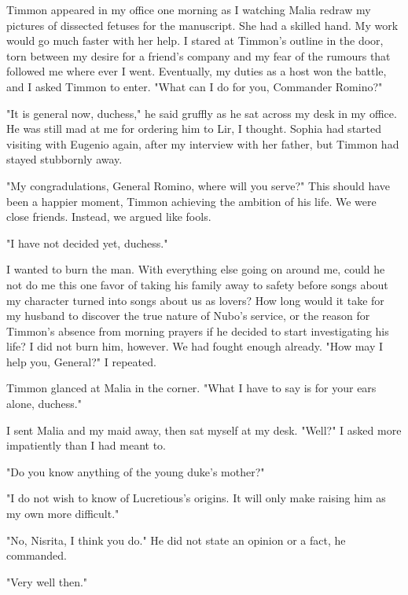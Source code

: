 \documentclass{article}
\begin{document}
Timmon appeared in my office one morning as I watching Malia redraw my pictures of dissected fetuses for the manuscript. She had a skilled hand. My work would go much faster with her help. I stared at Timmon's outline in the door, torn between my desire for a friend's company and my fear of the rumours that followed me where ever I went. Eventually, my duties as a host won the battle, and I asked Timmon to enter. "What can I do for you, Commander Romino?"

"It is general now, duchess," he said gruffly as he sat across my desk in my office. He was still mad at me for ordering him to Lir, I thought. Sophia had started visiting with Eugenio again, after my interview with her father, but Timmon had stayed stubbornly away. 

"My congradulations, General Romino, where will you serve?" This should have been a happier moment, Timmon achieving the ambition of his life. We were close friends. Instead, we argued like fools. 

"I have not decided yet, duchess."

I wanted to burn the man. With everything else going on around me, could he not do me this one favor of taking his family away to safety before songs about my character turned into songs about us as lovers? How long would it take for my husband to discover the true nature of Nubo's service, or the reason for Timmon's absence from morning prayers if he decided to start investigating his life? I did not burn him, however. We had fought enough already. "How may I help you, General?" I repeated.

Timmon glanced at Malia in the corner. "What I have to say is for your ears alone, duchess." 

I sent Malia and my maid away, then sat myself at my desk. "Well?" I asked more impatiently than I had meant to.

"Do you know anything of the young duke's mother?"

"I do not wish to know of Lucretious's origins. It will only make raising him as my own more difficult."

"No, Nisrita, I think you do." He did not state an opinion or a fact, he commanded. 

"Very well then."
\end{document}
